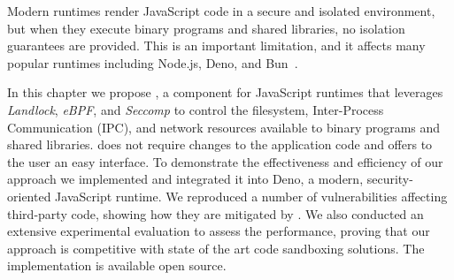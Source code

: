 Modern runtimes render JavaScript code in a secure and isolated
environment, but when they execute binary programs and shared
libraries, no isolation guarantees are provided. This is an important
limitation, and it affects many popular runtimes including Node.js,
Deno, and Bun~\cite{node-permissions,deno-permissions}.

In this chapter we propose \pap, a component for JavaScript runtimes
that leverages {\em Landlock}, {\em eBPF}, and {\em Seccomp} to
control the filesystem, Inter-Process Communication (IPC), and network
resources available to binary programs and shared libraries.  \pap
does not require changes to the application code and offers to the
user an easy interface.
%
To demonstrate the effectiveness and efficiency of our approach we
implemented \pap and integrated it into Deno, a modern,
security-oriented JavaScript runtime. We reproduced a number of
vulnerabilities affecting third-party code, showing how they are
mitigated by \pap. We also conducted an extensive experimental
evaluation to assess the performance, proving that our approach is
competitive with state of the art code sandboxing solutions. The
implementation is available open source.

